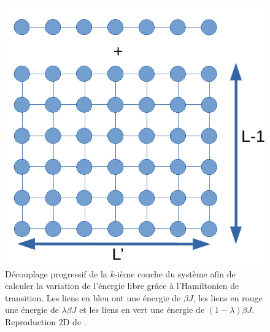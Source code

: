 \begin{figure}
\begin{minipage}[t]{0.32\linewidth}
		\caption*{$\mH(\lambda)$}		
	\end{minipage}
	\centering
	\begin{minipage}[t]{0.32\linewidth}
		\includegraphics[width=\linewidth]{isingtosos/cross-h1.pdf}
		\caption*{$\mH_1$}
	\end{minipage}
	\caption{Découplage progressif de la $k$-ième couche du système afin de calculer la variation de l'énergie libre grâce à l'Hamiltonien de transition. Les liens en bleu ont une énergie de $\beta J$, les liens en rouge une énergie de $\lambda \beta J $ et les liens en vert une énergie de $ (1-\lambda) \beta J$. Reproduction 2D de \cite{vasilyev_monte_2007}.}
	\label{decouplage}
\end{figure}

